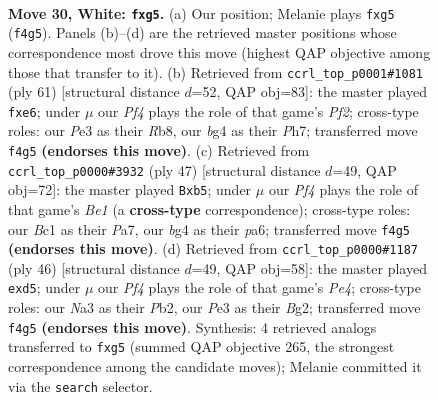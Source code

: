 \documentclass[11pt]{article}
\begin{document}
\clearpage

\begin{figure}[p]\centering
\begin{subfigure}{0.46\textwidth}\centering
\resizebox{\linewidth}{!}{%
\newchessgame
\chessboard[
  setfen={1r6/pp4k1/7p/2pr2p1/4pPbP/N3P3/PP3K2/R1B5 w - - 0 30},
  showmover=false,
  pgfstyle=straightmove, color=movearrow, markmove={f4-g5}
]}
\caption{}
\end{subfigure}\hfill
\begin{subfigure}{0.46\textwidth}\centering
\resizebox{\linewidth}{!}{%
\newchessgame
\chessboard[
  setfen={1r4k1/5p1p/R3P1p1/1pp2P2/2b1B1P1/6bP/8/3R2K1 b - - 0 31},
  showmover=false,
  pgfstyle=straightmove, color=movearrow, markmove={f7-e6}
]}
\caption{}
\end{subfigure}
\\[4pt]
\begin{subfigure}{0.46\textwidth}\centering
\resizebox{\linewidth}{!}{%
\newchessgame
\chessboard[
  setfen={4b1k1/p4pp1/P2rp2p/RBp5/4p1P1/1P2PP2/2P3P1/6K1 b - - 0 24},
  showmover=false,
  pgfstyle=straightmove, color=movearrow, markmove={e8-b5}
]}
\caption{}
\end{subfigure}\hfill
\begin{subfigure}{0.46\textwidth}\centering
\resizebox{\linewidth}{!}{%
\newchessgame
\chessboard[
  setfen={bn4k1/5rp1/1p2p2p/1P1pp3/4P2P/2N3P1/1P4B1/4K2R w K - 0 24},
  showmover=false,
  pgfstyle=straightmove, color=movearrow, markmove={e4-d5}
]}
\caption{}
\end{subfigure}
\caption{\textbf{Move 30, White: \texttt{fxg5}.} (a) Our position; Melanie plays \texttt{fxg5} (\texttt{f4g5}). Panels (b)--(d) are the retrieved master positions whose correspondence most drove this move (highest QAP objective among those that transfer to it). (b) Retrieved from \texttt{ccrl\_top\_p0001\#1081} (ply 61) [structural distance $d$=52, QAP obj=83]: the master played \texttt{fxe6}; under $\mu$ our \emph{Pf4} plays the role of that game's \emph{Pf2}; cross-type roles: our \emph{P}e3 as their \emph{R}b8, our \emph{b}g4 as their \emph{P}h7; transferred move \texttt{f4g5} \textbf{(endorses this move)}. (c) Retrieved from \texttt{ccrl\_top\_p0000\#3932} (ply 47) [structural distance $d$=49, QAP obj=72]: the master played \texttt{Bxb5}; under $\mu$ our \emph{Pf4} plays the role of that game's \emph{Be1} (a \textbf{cross-type} correspondence); cross-type roles: our \emph{B}c1 as their \emph{P}a7, our \emph{b}g4 as their \emph{p}a6; transferred move \texttt{f4g5} \textbf{(endorses this move)}. (d) Retrieved from \texttt{ccrl\_top\_p0000\#1187} (ply 46) [structural distance $d$=49, QAP obj=58]: the master played \texttt{exd5}; under $\mu$ our \emph{Pf4} plays the role of that game's \emph{Pe4}; cross-type roles: our \emph{N}a3 as their \emph{P}b2, our \emph{P}e3 as their \emph{B}g2; transferred move \texttt{f4g5} \textbf{(endorses this move)}. Synthesis: 4 retrieved analogs transferred to \texttt{fxg5} (summed QAP objective 265, the strongest correspondence among the candidate moves); Melanie committed it via the \texttt{search} selector.}
\label{fig:thought-m58}
\end{figure}
\end{document}
